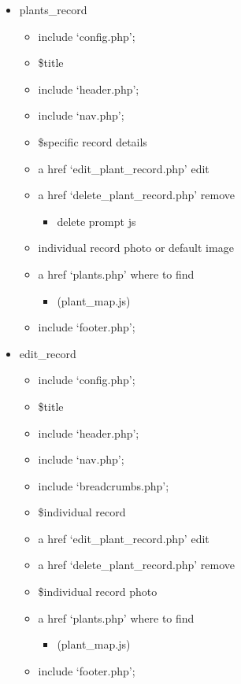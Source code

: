 \begin{itemize}
		\item plants\_record
		\begin{itemize}
			\item include `config.php';
			\item \$title
			\item include `header.php';
			\item include `nav.php';
			\item \$specific record details
			\item a href `edit\_plant\_record.php' edit
			\item a href `delete\_plant\_record.php' remove
			\begin{itemize}
				\item delete prompt js
			\end{itemize}
			\item individual record photo or default image
			\item a href `plants.php' where to find
			\begin{itemize}
				\item (plant\_map.js)
			\end{itemize}
			\item include `footer.php';
		\end{itemize}

		\item edit\_record
		\begin{itemize}
			\item include `config.php';
			\item \$title
			\item include `header.php';
			\item include `nav.php';
			\item include `breadcrumbs.php';
			\item \$individual record
			\item a href `edit\_plant\_record.php' edit
			\item a href `delete\_plant\_record.php' remove
			\item \$individual record photo
			\item a href `plants.php' where to find
			\begin{itemize}
				\item (plant\_map.js)
			\end{itemize}
			\item include `footer.php';
		\end{itemize}
	\end{itemize}

